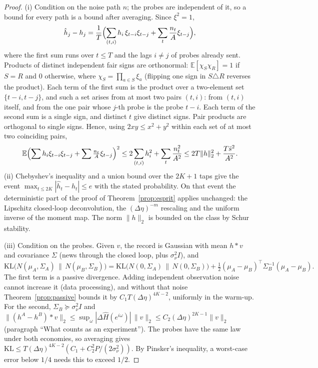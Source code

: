 \documentclass[12pt]{article}
\theoremstyle{definition}
\theoremstyle{remark}
\begin{document}
\begin{proof}
(i) Condition on the noise path $n$; the probes are independent of it, so a bound for every path is a bound after averaging. Since $\xi^2=1$,
\[
\hat h_j-h_j=\frac1T\Bigl(\sum_{(t,i)}h_i\,\xi_{t-i}\xi_{t-j}+\sum_t\frac{n_t}{A}\xi_{t-j}\Bigr),
\]
where the first sum runs over $t\le T$ and the lags $i\ne j$ of probes already sent. Products of distinct independent fair signs are orthonormal: $\mathbb E[\chi_S\chi_R]=1$ if $S=R$ and $0$ otherwise, where $\chi_S=\prod_{a\in S}\xi_a$ (flipping one sign in $S\triangle R$ reverses the product). Each term of the first sum is the product over a two-element set $\{t-i,t-j\}$, and such a set arises from at most two pairs $(t,i)$: from $(t,i)$ itself, and from the one pair whose $j$-th probe is the probe $t-i$. Each term of the second sum is a single sign, and distinct $t$ give distinct signs. Pair products are orthogonal to single signs. Hence, using $2xy\le x^2+y^2$ within each set of at most two coinciding pairs,
\[
\mathbb E\Bigl(\sum h_i\xi_{t-i}\xi_{t-j}+\sum\tfrac{n_t}{A}\xi_{t-j}\Bigr)^2\le2\sum_{(t,i)}h_i^2+\sum_t\frac{n_t^2}{A^2}\le2T\|h\|_2^2+\frac{T\bar s^2}{A^2}.
\]
(ii) Chebyshev's inequality and a union bound over the $2K+1$ taps give the event $\max_{t\le2K}|\hat h_t-h_t|\le e$ with the stated probability. On that event the deterministic part of the proof of Theorem~\ref{prop:esprit} applies unchanged: the Lipschitz closed-loop deconvolution, the $(\Delta\eta)^{-m}$ rescaling and the uniform inverse of the moment map. The norm $\|h\|_2$ is bounded on the class by Schur stability.

(iii) Condition on the probes. Given $v$, the record is Gaussian with mean $h*v$ and covariance $\Sigma$ (news through the closed loop, plus $\sigma_\nu^2I$), and
\[
\mathrm{KL}\bigl(N(\mu_A,\Sigma_A)\,\|\,N(\mu_B,\Sigma_B)\bigr)=\mathrm{KL}\bigl(N(0,\Sigma_A)\,\|\,N(0,\Sigma_B)\bigr)+\tfrac12(\mu_A-\mu_B)^\top\Sigma_B^{-1}(\mu_A-\mu_B).
\]
The first term is a passive divergence. Adding independent observation noise cannot increase it (data processing), and without that noise Theorem~\ref{prop:passive} bounds it by $C_1T(\Delta\eta)^{4K-2}$, uniformly in the warm-up. For the second, $\Sigma_B\succeq\sigma_\nu^2I$ and $\|(h^A-h^B)*v\|_2\le\sup_\omega|\Delta\hat H(e^{i\omega})|\,\|v\|_2\le C_2(\Delta\eta)^{2K-1}\|v\|_2$ (paragraph ``What counts as an experiment''). The probes have the same law under both economies, so averaging gives $\mathrm{KL}\le T(\Delta\eta)^{4K-2}(C_1+C_2^2P/(2\sigma_\nu^2))$. By Pinsker's inequality, a worst-case error below $1/4$ needs this to exceed $1/2$.
\end{proof}
\end{document}
